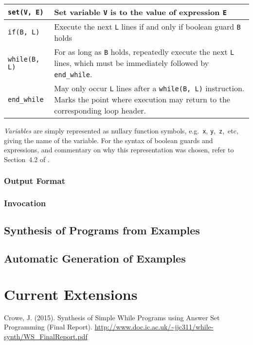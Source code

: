 \documentclass[a4paper,twoside,notitlepage,12pt]{article}
\begin{document}
\begin{tabularx}{\textwidth}{|l|X|}
\hline
\verb|set(V, E)| &
Set variable \verb|V| is to the value of expression \verb|E| \\
\hline
\verb|if(B, L)| &
Execute the next \verb|L| lines if and only if boolean guard \verb|B| holds \\
\hline
\verb|while(B, L)| &
For as long as \verb|B| holds, repeatedly execute the next \verb|L| lines, which must 
be immediately followed by \verb|end_while|. \\
\hline
\verb|end_while| &
May only occur \verb|L| lines after a \verb|while(B, L)| instruction. Marks the point 
where execution may return to the corresponding loop header. \\
\hline
\end{tabularx}

\emph{Variables} are simply represented as nullary function symbols, e.g.\ \verb|x|, 
\verb|y|,\ \verb|z|,\ etc, giving the name of the variable. For the syntax of boolean 
guards and expressions, and commentary on why this representation was chosen, refer to 
Section~4.2 of \cite{final}.

\subsubsection{Output Format}

\subsubsection{Invocation}

\subsection{Synthesis of Programs from Examples} \label{sec:psynx}

\subsection{Automatic Generation of Examples} \label{sec:pgenx}

\section{Current Extensions}

\begin{thebibliography}{9}
        Crowe, J. (2015).
        Synthesis of Simple While Programs using Answer Set Programming (Final Report).
        \url{http://www.doc.ic.ac.uk/~jjc311/while-synth/WS_FinalReport.pdf}
\end{thebibliography}
\end{document}
